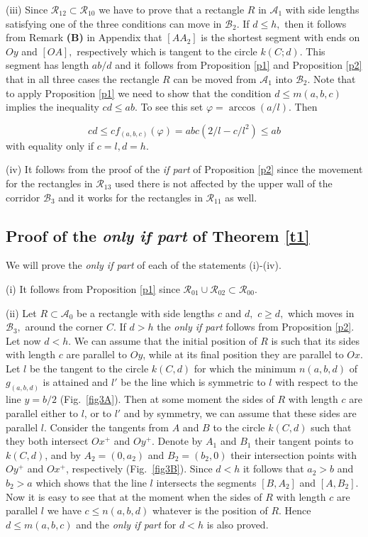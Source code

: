\documentclass[12pt]{amsart}
\def\A{\mathcal A}
\def\B{\mathcal B}
\def\R{\mathcal R}
\def\s{\smallskip}
\def\n{\noindent}
\def\ss{\subset}
\begin{document}
\s

(iii) Since $\R_{12}\ss \R_{10}$ we have to prove that a rectangle
$R$ in $\A_1$ with side lengths satisfying one of the three
conditions can move in $\B_2 .$ If $d\le h,$ then it follows from
Remark \textbf{(B)} in Appendix that $[AA_2]$ is the shortest
segment with ends on $Oy$ and $[OA],$ respectively which is
tangent to the circle $k(C;d)$. This segment has length $ab/d$ and
it follows from Proposition \ref{p1} and Proposition \ref{p2} that
in all three cases the rectangle $R$ can be moved from $\A_1$ into
$\B_2.$ Note that to apply Proposition \ref{p1} we need to show
that the condition $d\leq m(a,b,c)$ implies the inequality $cd\leq
ab .$ To see this set $\varphi= \arccos (a/l). $ Then

\begin{equation}\label{8}
cd\leq cf_{(a,b,c)}(\varphi)=abc(2/l-c/l^2)\leq ab
\end{equation}
with equality only if $c=l, d=h$.

\s

(iv) It follows from the proof of the \emph{if part } of
Proposition \ref{p2} since the movement for the rectangles in
$\R_{13}$ used there is not affected by the upper wall of the
corridor  $\B_3$ and it works for the rectangles in $\R_{11}$ as
well.

\n\subsection{Proof of the \emph{only if part} of Theorem
\ref{t1}}

We will prove the \emph{only if part } of each of the statements
(i)-(iv).

\s

(i) It follows from Proposition \ref {p1} since $\R_{01}\cup
\R_{02}\ss \R_{00}$.

\s

(ii) Let $R\ss \A_0$ be a rectangle with side lengths  $c$ and $d,$
$c\ge d,$ which moves in $\B_3,$ around the corner $C$. If $d>h$
the \emph{only if part} follows from Proposition \ref{p2}. Let now
$d<h$. We can assume that the initial position of $R$ is such that
its sides with length $c$ are parallel to $Oy$, while at its final
position they are parallel to $Ox$. Let $l$ be the tangent to the
circle $k(C,d)$ for which the minimum $n(a,b,d)$ of $g_{(a,b,d)}$
is attained and $l'$ be the line which is symmetric to $l$ with
respect to the line $y=b/2$ (Fig.~\ref{fig3A}). Then at some
moment the sides of $R$ with length $c$ are parallel either to
$l$, or to $l'$ and by symmetry, we can assume that these sides
are parallel $l$. Consider the tangents from $A$ and $B$ to the
circle $k(C,d)$ such that they both intersect $Ox^+$ and $Oy^+$.
Denote by $A_1$ and $B_1$ their tangent points to $k(C,d)$, and by
$A_2=(0,a_2)$ and $B_2=(b_2,0)$ their intersection points with
$Oy^+$ and $Ox^+$, respectively (Fig.~\ref{fig3B}). Since $d<h$ it
follows that $a_2> b $ and $ b_2> a $ which shows that the line
$l$ intersects the segments $[B,A_2]$ and $[A,B_2]$. Now it is
easy to see that at the moment when the sides of $R$ with length
$c$ are parallel $l$ we have $c\le n(a,b,d)$ whatever is the
position of $R$. Hence $d\le m(a,b,c) $ and the \emph{only if
part} for $d<h$ is also proved.
\end{document}
